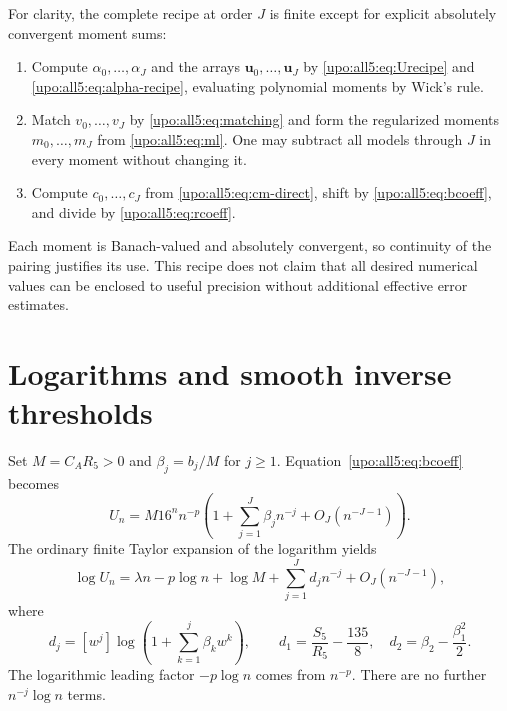 \documentclass[11pt,letterpaper]{article}
\theoremstyle{remark}\newtheorem{remark}[theorem]{Remark}
\numberwithin{equation}{section}
\newcommand{\bfU}{\boldsymbol u}
\begin{document}
For clarity, the complete recipe at order $J$ is finite except for
explicit absolutely convergent moment sums:
\begin{enumerate}
\item Compute $\alpha_0,\ldots,\alpha_J$ and the arrays
$\bfU_0,\ldots,\bfU_J$ by \eqref{upo:all5:eq:Urecipe} and
\eqref{upo:all5:eq:alpha-recipe}, evaluating polynomial moments by Wick's rule.
\item Match $v_0,\ldots,v_J$ by \eqref{upo:all5:eq:matching} and form the
regularized moments $m_0,\ldots,m_J$ from \eqref{upo:all5:eq:ml}. One may
subtract all models through $J$ in every moment without changing it.
\item Compute $c_0,\ldots,c_J$ from \eqref{upo:all5:eq:cm-direct}, shift by
\eqref{upo:all5:eq:bcoeff}, and divide by \eqref{upo:all5:eq:rcoeff}.
\end{enumerate}
Each moment is Banach-valued and absolutely convergent, so continuity
of the pairing justifies its use. This recipe does not claim that
all desired numerical values can be enclosed to useful precision
without additional effective error estimates.

\section{Logarithms and smooth inverse thresholds}\label{upo:all5:sec:inverse}
Set $M=C_AR_5>0$ and $\beta_j=b_j/M$ for $j\ge1$.
Equation~\eqref{upo:all5:eq:bcoeff} becomes
\begin{equation}\label{upo:all5:eq:full-normalized}
 U_n=M16^nn^{-p}\left(1+\sum_{j=1}^J\beta_jn^{-j}
                                      +O_J(n^{-J-1})\right).
\end{equation}
The ordinary finite Taylor expansion of the logarithm yields
\begin{equation}\label{upo:all5:eq:log-count}
 \log U_n=\lambda n-p\log n+\log M
             +\sum_{j=1}^Jd_jn^{-j}+O_J(n^{-J-1}),
\end{equation}
where
\begin{equation}\label{upo:all5:eq:dcoef}
 d_j=[w^j]\log\left(1+\sum_{k=1}^j\beta_kw^k\right),\qquad
 d_1=\frac{S_5}{R_5}-\frac{135}{8},\quad
 d_2=\beta_2-\frac{\beta_1^2}{2}.
\end{equation}
The logarithmic leading factor $-p\log n$ comes from $n^{-p}$.
There are no further $n^{-j}\log n$ terms.
\end{document}
